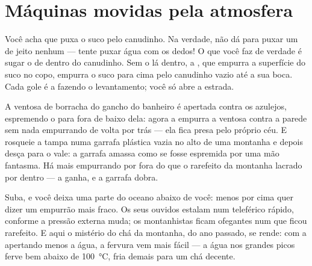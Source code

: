 \section{Máquinas movidas pela atmosfera}

\begin{example}[O canudinho]\label{ex:g5:air-pressure-weather:straw}
Você acha que puxa o suco pelo canudinho. Na verdade, não dá para
puxar um  de jeito nenhum --- tente puxar água com os dedos! O
que você faz de verdade é sugar o \emph{} de dentro do canudinho.
Sem o  lá dentro, a , que empurra a superfície do suco no
copo, empurra o suco para cima pelo canudinho vazio até a sua boca.
Cada gole é a  fazendo o levantamento; você só abre a
estrada.
\end{example}

\begin{example}\label{ex:g5:air-pressure-weather:suction}
A ventosa de borracha do gancho do banheiro é apertada contra os
azulejos, espremendo o  para fora de baixo dela: agora a 
empurra a ventosa contra a parede sem nada empurrando de volta por
trás --- ela fica presa pelo próprio céu. E rosqueie a tampa numa
garrafa plástica vazia no alto de uma montanha e depois desça para o
vale: a garrafa amassa como se fosse espremida por uma mão fantasma.
Há mais  empurrando por fora do que o  rarefeito da montanha
lacrado por dentro --- a  ganha, e a garrafa dobra.
\end{example}

\begin{example}\label{ex:g5:air-pressure-weather:height}
Suba, e você deixa uma parte do oceano abaixo de você: menos  por
cima quer dizer um empurrão mais fraco. Os seus ouvidos estalam num
teleférico rápido, conforme a pressão externa muda; os montanhistas
ficam ofegantes num  que ficou rarefeito. E aqui o mistério do chá
da montanha, do ano passado, se rende: com a  apertando
menos a água, a fervura vem mais fácil --- a água nos grandes picos
ferve bem abaixo de \qty{100}{\celsius}, fria demais para um chá
decente.
\end{example}

